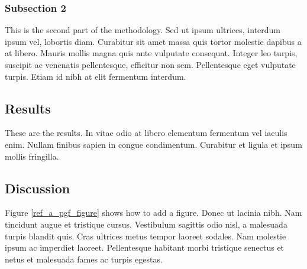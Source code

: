 \hypertarget{subsection-2-1}{%
\subsubsection{Subsection 2}\label{subsection-2-1}}

This is the second part of the methodology. Sed ut ipsum ultrices,
interdum ipsum vel, lobortis diam. Curabitur sit amet massa quis
tortor molestie dapibus a at libero. Mauris mollis magna quis ante
vulputate consequat. Integer leo turpis, suscipit ac venenatis
pellentesque, efficitur non sem. Pellentesque eget vulputate turpis.
Etiam id nibh at elit fermentum interdum.

\hypertarget{results-1}{%
\subsection{Results}\label{results-1}}

These are the results. In vitae odio at libero elementum fermentum
vel iaculis enim. Nullam finibus sapien in congue condimentum.
Curabitur et ligula et ipsum mollis fringilla.

\hypertarget{discussion-1}{%
\subsection{Discussion}\label{discussion-1}}

Figure \ref{ref_a_pgf_figure} shows how to add a figure. Donec ut
lacinia nibh. Nam tincidunt augue et tristique cursus. Vestibulum
sagittis odio nisl, a malesuada turpis blandit quis. Cras ultrices
metus tempor laoreet sodales. Nam molestie ipsum ac imperdiet
laoreet. Pellentesque habitant morbi tristique senectus et netus et
malesuada fames ac turpis egestas.

